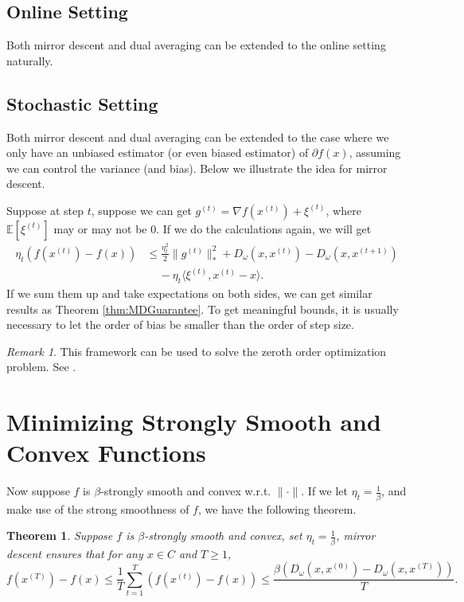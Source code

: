\documentclass[openany]{book}
\newtheorem{theorem}{Theorem}[chapter]
\theoremstyle{definition}
\theoremstyle{remark}
\newtheorem*{remark}{Remark}
\begin{document}
\subsection{Online Setting}
Both mirror descent and dual averaging can be extended to the online setting naturally.

\subsection{Stochastic Setting}
Both mirror descent and dual averaging can be extended to the case where we only have an unbiased estimator (or even biased estimator) of $\partial f(x)$, assuming we can control the variance (and bias). Below we illustrate the idea for mirror descent.

Suppose at step $t$, suppose we can get $g^{(t)}=\nabla f(x^{(t)})+\xi^{(t)}$, where $\mathbb{E}[\xi^{(t)}]$ may or may not be $0$. If we do the calculations again, we will get
\begin{equation*}
    \begin{split}
         \eta_t\left(f(x^{(t)})-f(x)\right) & \le \frac{\eta_t^2}{2}\|g^{(t)}\|_*^2+D_{\omega}(x,x^{(t)})-D_{\omega}(x,x^{(t+1)}) \\
          & \quad\,-\eta_t \langle\xi^{(t)},x^{(t)}-x\rangle.
    \end{split}
\end{equation*}
If we sum them up and take expectations on both sides, we can get similar results as Theorem \ref{thm:MDGuarantee}. To get meaningful bounds, it is usually necessary to let the order of bias be smaller than the order of step size.
\begin{remark}
    This framework can be used to solve the zeroth order optimization problem. See \cite{DJWW15}.
\end{remark}

\section{Minimizing Strongly Smooth and Convex Functions}
Now suppose $f$ is $\beta$-strongly smooth and convex w.r.t. $\|\cdot\|$. If we let $\eta_t=\frac{1}{\beta}$, and make use of the strong smoothness of $f$, we have the following theorem.
\begin{theorem}
    Suppose $f$ is $\beta$-strongly smooth and convex, set $\eta_t=\frac{1}{\beta}$, mirror descent ensures that for any $x\in C$ and $T\ge1$,
    \begin{equation*}
        f(x^{(T)})-f(x)\le\frac{1}{T}\sum_{t=1}^{T}\left(f(x^{(t)})-f(x)\right)\le \frac{\beta\left(D_{\omega}(x,x^{(0)})-D_{\omega}(x,x^{(T)})\right)}{T}.
    \end{equation*}
\end{theorem}
\end{document}
